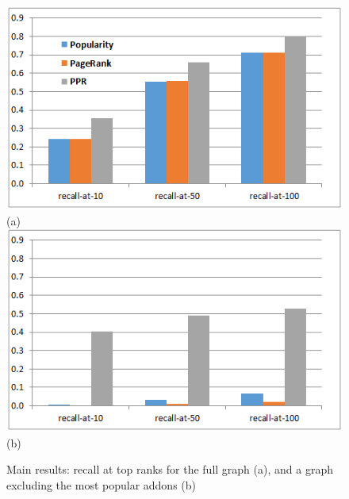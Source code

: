 \documentclass[11pt,oneside]{book}
\begin{document}
\begin{figure}[t]
\centering
	\centering
\includegraphics[scale=0.8]{figures/pop-final.png} \\
(a) \\
	\centering
\includegraphics[scale=0.8]{figures/sans-popular-final.png} \\
(b) \\
	\caption{Main results: recall at top ranks for the full graph (a), and a graph excluding the most popular addons (b)}
	\label{fig:main}
\end{figure}
\end{document}
